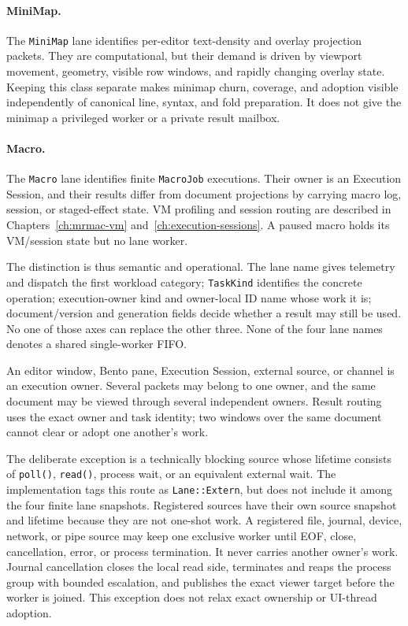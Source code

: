 \documentclass[a4paper,10pt,twoside,openany]{book}
\begin{document}
\paragraph{MiniMap.}
The \texttt{MiniMap} lane identifies per-editor text-density and overlay
projection packets. They are computational, but their demand is driven by
viewport movement, geometry, visible row windows, and rapidly changing overlay
state. Keeping this class separate makes minimap churn, coverage, and adoption
visible independently of canonical line, syntax, and fold preparation. It does
not give the minimap a privileged worker or a private result mailbox.

\paragraph{Macro.}
The \texttt{Macro} lane identifies finite \texttt{MacroJob} executions. Their
owner is an Execution Session, and their results differ from document
projections by carrying macro log, session, or staged-effect state. VM
profiling and session routing are described in
Chapters~\ref{ch:mrmac-vm} and~\ref{ch:execution-sessions}. A paused macro
holds its VM/session state but no lane worker.

The distinction is thus semantic and operational. The lane name gives
telemetry and dispatch the first workload category; \texttt{TaskKind}
identifies the concrete operation; execution-owner kind and owner-local ID name
whose work it is; document/version and generation fields decide whether a
result may still be used. No one of those axes can replace the other three.
None of the four lane names denotes a shared single-worker FIFO.

An editor window, Bento pane, Execution Session, external source, or channel is
an execution owner. Several packets may belong to one owner, and the same
document may be viewed through several independent owners. Result routing uses
the exact owner and task identity; two windows over the same document cannot
clear or adopt one another's work.

The deliberate exception is a technically blocking source whose lifetime
consists of \texttt{poll()}, \texttt{read()}, process wait, or an equivalent
external wait. The implementation tags this route as \texttt{Lane::Extern},
but does not include it among the four finite lane snapshots. Registered
sources have their own source snapshot and lifetime because they are not
one-shot work. A registered file, journal, device, network, or pipe source may
keep one exclusive worker until EOF, close, cancellation, error, or process
termination. It never carries another owner's work. Journal cancellation
closes the local read side, terminates and reaps the process group with bounded
escalation, and publishes the exact viewer target before the worker is joined.
This exception does not relax exact ownership or UI-thread adoption.
\end{document}
